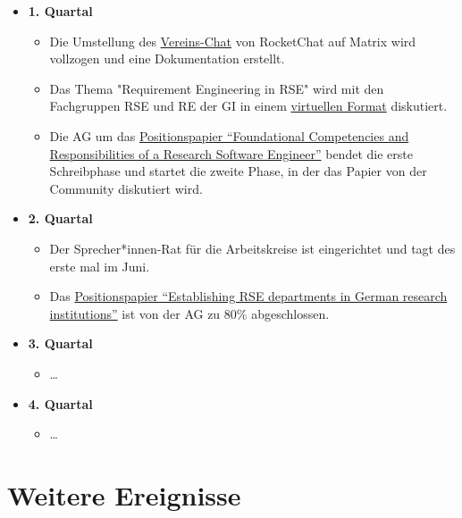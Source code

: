 \begin{itemize}
 \item[] \textbf{1. Quartal}
   \begin{itemize}
     \item Die Umstellung des \href{https://de-rse.org/de/matrix.html}{Vereins-Chat} von RocketChat auf Matrix wird vollzogen und eine Dokumentation erstellt.
     \item Das Thema "Requirement Engineering in RSE" wird mit den Fachgruppen RSE und RE der GI in einem \href{https://fg-re.gi.de/veranstaltung/event-re-and-rse}{virtuellen Format} diskutiert.
     \item Die AG um das \href{https://github.com/the-teachingRSE-project/competencies}{Positionspapier “Foundational Competencies and Responsibilities of a Research Software Engineer”} bendet die erste Schreibphase und startet die zweite Phase, in der das Papier von der Community diskutiert wird.  
  
     

   \end{itemize}\clearpage
 \item[] \textbf{2. Quartal}
   \begin{itemize}
    \item Der Sprecher*innen-Rat für die Arbeitskreise ist eingerichtet und tagt des erste mal im Juni.
    \item Das \href{https://github.com/DE-RSE/2023_paper-RSE-groups}{Positionspapier “Establishing RSE departments in German research institutions”} ist von der AG zu 80\% abgeschlossen. 
    
   \end{itemize}
 \item[] \textbf{3. Quartal}
   \begin{itemize}

    \item \dots
    
   \end{itemize}
 \item[] \textbf{4. Quartal}
   \begin{itemize}
    \item \dots
   \end{itemize}
\end{itemize}
\clearpage
\section{Weitere Ereignisse}

